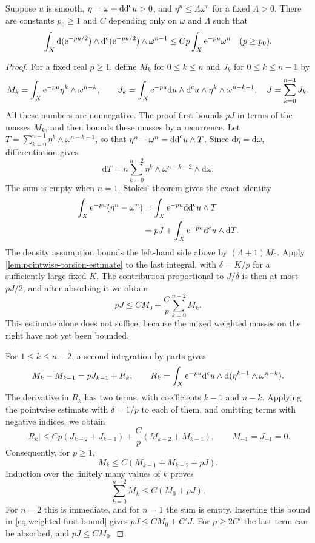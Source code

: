 \begin{lemma}\label{lem:cherrier-gradient}
Suppose $u$ is smooth, $\eta=\omega+\mathrm{dd}^{\mathrm{c}} u>0$, and
$\eta^n\leq\Lambda\omega^n$ for a fixed $\Lambda>0$. There are constants $p_0\geq1$ and $C$ depending only on $\omega$ and $\Lambda$ such that
\[
 \int_X\mathrm{d}(\mathrm{e}^{-pu/2})\wedge\mathrm d^{\mathrm c}(\mathrm{e}^{-pu/2})\wedge\omega^{n-1}
 \leq Cp\int_X\mathrm{e}^{-pu}\omega^n\quad(p\geq p_0).
\]
\end{lemma}
\begin{proof}
For a fixed real $p\geq1$, define $M_k$ for $0\leq k\leq n$ and $J_k$ for $0\leq k\leq n-1$ by
\[
 M_k=\int_X\mathrm{e}^{-pu}\eta^k\wedge\omega^{n-k},\qquad
 J_k=\int_X\mathrm{e}^{-pu}\mathrm{d}u\wedge\mathrm d^{\mathrm c} u\wedge\eta^k\wedge\omega^{n-k-1},
 \quad J=\sum_{k=0}^{n-1}J_k.
\]
All these numbers are nonnegative. The proof first bounds $pJ$ in terms of the masses $M_k$, and then bounds these masses by a recurrence. Let
$T=\sum_{k=0}^{n-1}\eta^k\wedge\omega^{n-k-1}$, so that $\eta^n-\omega^n=\mathrm{dd}^{\mathrm{c}} u\wedge T$. Since $\mathrm{d}\eta=\mathrm{d}\omega$, differentiation gives
\[
 \mathrm{d}T=n\sum_{k=0}^{n-2}\eta^k\wedge\omega^{n-k-2}\wedge \mathrm{d}\omega.
\]
The sum is empty when $n=1$. Stokes' theorem gives the exact identity
\[
 \begin{split}
 \int_X\mathrm{e}^{-pu}(\eta^n-\omega^n)
 &=\int_X\mathrm{e}^{-pu}\mathrm{dd}^{\mathrm{c}} u\wedge T\\
 &=pJ+\int_X\mathrm{e}^{-pu}\mathrm d^{\mathrm c} u\wedge \mathrm{d}T.
 \end{split}
\]
The density assumption bounds the left-hand side above by $(\Lambda+1)M_0$. Apply \cref{lem:pointwise-torsion-estimate} to the last integral, with $\delta=K/p$ for a sufficiently large fixed $K$. The contribution proportional to $J/\delta$ is then at most $pJ/2$, and after absorbing it we obtain
\begin{equation}\label{eq:weighted-first-bound}
 pJ\leq CM_0+\frac Cp\sum_{k=0}^{n-2}M_k.
\end{equation}
This estimate alone does not suffice, because the mixed weighted masses on the right have not yet been bounded.

For $1\leq k\leq n-2$, a second integration by parts gives
\begin{equation}\label{eq:weighted-recurrence}
 M_k-M_{k-1}=pJ_{k-1}+R_k,
 \qquad
 R_k=\int_X\mathrm{e}^{-pu}\mathrm d^{\mathrm c} u\wedge
                \mathrm{d}(\eta^{k-1}\wedge\omega^{n-k}).
\end{equation}
The derivative in $R_k$ has two terms, with coefficients $k-1$ and $n-k$. Applying the pointwise estimate with $\delta=1/p$ to each of them, and omitting terms with negative indices, we obtain
\[
 |R_k|\leq Cp(J_{k-2}+J_{k-1})
                   +\frac Cp(M_{k-2}+M_{k-1}),
 \qquad M_{-1}=J_{-1}=0.
\]
Consequently, for $p\geq1$,
\[
 M_k\leq C(M_{k-1}+M_{k-2}+pJ).
\]
Induction over the finitely many values of $k$ proves
\[
 \sum_{k=0}^{n-2}M_k\leq C(M_0+pJ).
\]
For $n=2$ this is immediate, and for $n=1$ the sum is empty. Inserting this bound in \eqref{eq:weighted-first-bound} gives
$pJ\leq CM_0+C'J$. For $p\geq2C'$ the last term can be absorbed, and $pJ\leq CM_0$.


\end{proof}
